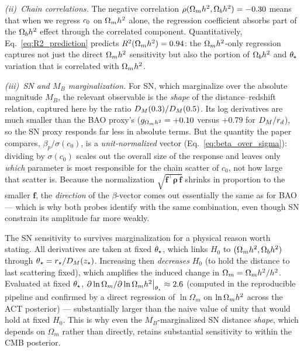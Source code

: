 \textit{(ii)~Chain correlations.} The negative correlation $\rho(\Omega_m h^2, \Omega_b h^2) = -0.30$ means that when we regress $c_0$ on $\Omega_m h^2$ alone, the regression coefficient absorbs part of the $\Omega_b h^2$ effect through the correlated component. Quantitatively, Eq.~\eqref{eq:R2_prediction} predicts $R^2(\Omega_m h^2) = 0.94$: the $\Omega_m h^2$-only regression captures not just the direct $\Omega_m h^2$ sensitivity but also the portion of $\Omega_b h^2$ and $\theta_\star$ variation that is correlated with $\Omega_m h^2$.

\textit{(iii)~SN and $M_B$ marginalization.} For SN, which marginalize over the absolute magnitude $M_B$, the relevant observable is the \emph{shape} of the distance--redshift relation, captured here by the ratio $D_M(0.3)/D_M(0.5)$. Its log derivatives are much smaller than the BAO proxy's ($g_{\Omega_m h^2} = +0.10$ versus $+0.79$ for $D_M/r_d$), so the SN proxy responds far less in absolute terms. But the quantity the paper compares, $\beta_p/\sigma(c_0)$, is a \emph{unit-normalized} vector (Eq.~\ref{eq:beta_over_sigma}): dividing by $\sigma(c_0)$ scales out the overall size of the response and leaves only \emph{which} parameter is most responsible for the chain scatter of $c_0$, not how large that scatter is. Because the normalization $\sqrt{\mathbf{f}^\top \boldsymbol{\rho}\, \mathbf{f}}$ shrinks in proportion to the smaller $\mathbf{f}$, the \emph{direction} of the $\beta$-vector comes out essentially the same as for BAO --- which is why both probes identify \czero with the same \omh combination, even though SN constrain its amplitude far more weakly.

The SN sensitivity to \omh survives \MB marginalization for a physical reason worth stating. All derivatives are taken at fixed $\theta_\star$, which links $H_0$ to $(\Omega_m h^2, \Omega_b h^2)$ through $\theta_\star = r_\star / D_M(z_\star)$. Increasing \omh then \emph{decreases} $H_0$ (to hold the distance to last scattering fixed), which amplifies the induced change in $\Omega_m = \Omega_m h^2/h^2$. Evaluated at fixed $\theta_\star$, $\partial \ln \Omega_m / \partial \ln \Omega_m h^2 \big|_{\theta_\star} \approx 2.6$ (computed in the reproducible pipeline and confirmed by a direct regression of $\ln\Omega_m$ on $\ln\Omega_m h^2$ across the ACT \LCDM posterior) --- substantially larger than the naive value of unity that would hold at fixed $H_0$. This is why even the $M_B$-marginalized SN distance \emph{shape}, which depends on $\Omega_m$ rather than \omh directly, retains substantial sensitivity to \omh within the CMB posterior.
